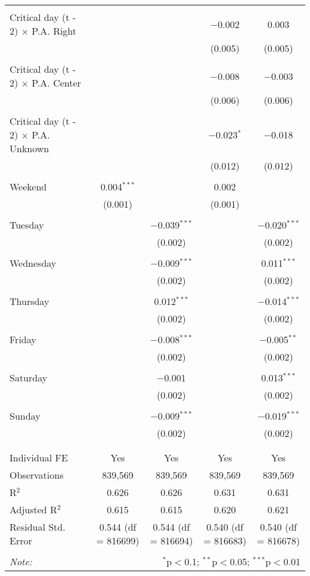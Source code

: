 \documentclass[
]{article}
\begin{document}
\begin{table}[!htbp]
{\begin{tabular}{@{\extracolsep{5pt}}lcccc}
  & & & & \\ 
 Critical day (t - 2) $\times$ P.A. Right &  &  & $-$0.002 & 0.003 \\ 
  &  &  & (0.005) & (0.005) \\ 
  & & & & \\ 
 Critical day (t - 2) $\times$ P.A. Center &  &  & $-$0.008 & $-$0.003 \\ 
  &  &  & (0.006) & (0.006) \\ 
  & & & & \\ 
 Critical day (t - 2) $\times$ P.A. Unknown &  &  & $-$0.023$^{*}$ & $-$0.018 \\ 
  &  &  & (0.012) & (0.012) \\ 
  & & & & \\ 
 Weekend & 0.004$^{***}$ &  & 0.002 &  \\ 
  & (0.001) &  & (0.001) &  \\ 
  & & & & \\ 
 Tuesday &  & $-$0.039$^{***}$ &  & $-$0.020$^{***}$ \\ 
  &  & (0.002) &  & (0.002) \\ 
  & & & & \\ 
 Wednesday &  & $-$0.009$^{***}$ &  & 0.011$^{***}$ \\ 
  &  & (0.002) &  & (0.002) \\ 
  & & & & \\ 
 Thursday &  & 0.012$^{***}$ &  & $-$0.014$^{***}$ \\ 
  &  & (0.002) &  & (0.002) \\ 
  & & & & \\ 
 Friday &  & $-$0.008$^{***}$ &  & $-$0.005$^{**}$ \\ 
  &  & (0.002) &  & (0.002) \\ 
  & & & & \\ 
 Saturday &  & $-$0.001 &  & 0.013$^{***}$ \\ 
  &  & (0.002) &  & (0.002) \\ 
  & & & & \\ 
 Sunday &  & $-$0.009$^{***}$ &  & $-$0.019$^{***}$ \\ 
  &  & (0.002) &  & (0.002) \\ 
  & & & & \\ 
\hline \\[-1.8ex] 
Individual FE & Yes & Yes & Yes & Yes \\ 
Observations & 839,569 & 839,569 & 839,569 & 839,569 \\ 
R$^{2}$ & 0.626 & 0.626 & 0.631 & 0.631 \\ 
Adjusted R$^{2}$ & 0.615 & 0.615 & 0.620 & 0.621 \\ 
Residual Std. Error & 0.544 (df = 816699) & 0.544 (df = 816694) & 0.540 (df = 816683) & 0.540 (df = 816678) \\ 
\hline 
\hline \\[-1.8ex] 
\textit{Note:}  & \multicolumn{4}{r}{$^{*}$p$<$0.1; $^{**}$p$<$0.05; $^{***}$p$<$0.01} \\ 
\end{tabular}
} 
\end{table} 
\newpage
\end{document}

